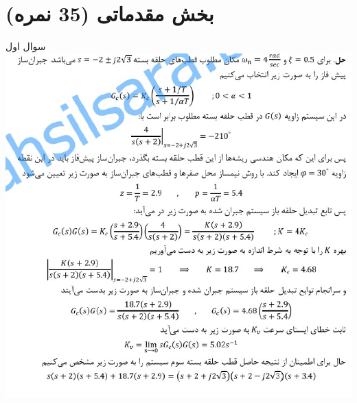 \documentclass{article}
\title{\lr{HW1 Solutions}}
\date{}
\author{نویسنده : رضا شهریاری}
\begin{document}
\markboth{\theauthor}{\thetitle}

\maketitle




\raggedleft
\section{بخش مقدماتی (35 نمره)}
\centering


    \begin{problem}{سوال اول}
    	\includegraphics[width=\linewidth]{Resources/1.png}
   
    \end{problem}
\end{document}
